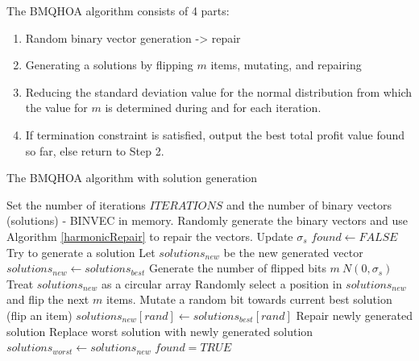 \documentclass[titlepage]{article}
\begin{document}
The BMQHOA algorithm consists of 4 parts:
\begin{enumerate}
    \item Random binary vector generation -> repair
    \item Generating a solutions by flipping $m$ items, mutating, and repairing
    \item Reducing the standard deviation value for the normal distribution from which the value for $m$ is determined during and for each iteration.
    \item If termination constraint is satisfied, output the best total profit value found so far, else return to Step 2.
\end{enumerate}

\begin{breakablealgorithm}
\caption{The BMQHOA algorithm with solution generation}\label{BMQHOA}
    \begin{algorithmic}[1]
        \State Set the number of iterations $ITERATIONS$ and the number of binary vectors (solutions) - BINVEC in memory.
        \State Randomly generate the binary vectors and use Algorithm \ref{harmonicRepair} to repair the vectors. 
            \State Update $\sigma_{s}$
            \State $found \gets FALSE$
                \State Try to generate a solution
                \State Let $solutions_{new}$ be the new generated vector 
                \State $solutions_{new} \gets solutions_{best}$
                \State Generate the number of flipped bits $m ~ N(0, \sigma_{s})$
                \State Treat $solutions_{new}$ as a circular array
                \State Randomly select a position in $solutions_{new}$ and flip the next $m$ items.
                \State Mutate a random bit towards current best solution (flip an item)
                \State $solutions_{new}[rand] \gets solutions_{best}[rand]$
                \State Repair newly generated solution
                    \State Replace worst solution with newly generated solution
                    \State $solutions_{worst} \gets solutions_{new}$
                    \State $found = TRUE$
                \EndIf
            \EndWhile
        \EndWhile
    \end{algorithmic}
\end{breakablealgorithm}
\vskip 0.5cm
\end{document}
